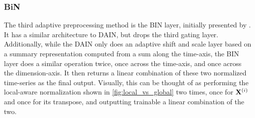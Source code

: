\documentclass{statsmsc}
\begin{document}
{%



\subsubsection{BiN}%
\label{ssub:BiN}



The third adaptive preprocessing method is the \acf{BIN} layer, initially
presented by \cite{bin}. It has a similar architecture to \ac{DAIN}, but drops the
third gating layer. Additionally, while the \ac{DAIN} only does an adaptive shift and scale layer
based on a summary representation computed from a sum along the time-axis, the \ac{BIN} layer
does a similar operation twice, once across the time-axis, and once across the dimension-axis.
It then returns a linear combination of these two normalized time-series as the
final output. Visually, this can be thought of as performing the local-aware normalization
shown in \cref{fig:local_vs_global} two times, once for $\mathbf{X}^{(i)}$ and once for its transpose,
and outputting trainable a linear combination of the two.

}
\end{document}

